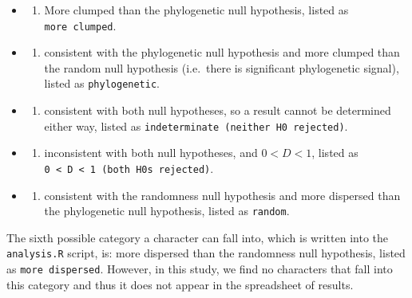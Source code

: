 \begin{itemize}
\item
  \begin{enumerate}
  \def\labelenumi{(\roman{enumi})}
  \tightlist
  \item
    More clumped than the phylogenetic null hypothesis, listed as
    \texttt{more\ clumped}.
  \end{enumerate}
\item
  \begin{enumerate}
  \def\labelenumi{(\roman{enumi})}
  \setcounter{enumi}{1}
  \tightlist
  \item
    consistent with the phylogenetic null hypothesis and more clumped
    than the random null hypothesis (i.e.~there is significant
    phylogenetic signal), listed as \texttt{phylogenetic}.
  \end{enumerate}
\item
  \begin{enumerate}
  \def\labelenumi{(\roman{enumi})}
  \setcounter{enumi}{2}
  \tightlist
  \item
    consistent with both null hypotheses, so a result cannot be
    determined either way, listed as
    \texttt{indeterminate\ (neither\ H0\ rejected)}.
  \end{enumerate}
\item
  \begin{enumerate}
  \def\labelenumi{(\roman{enumi})}
  \setcounter{enumi}{3}
  \tightlist
  \item
    inconsistent with both null hypotheses, and \(0 < D < 1\), listed as
    \texttt{0\ \textless{}\ D\ \textless{}\ 1\ (both\ H0s\ rejected)}.
  \end{enumerate}
\item
  \begin{enumerate}
  \def\labelenumi{(\alph{enumi})}
  \setcounter{enumi}{21}
  \tightlist
  \item
    consistent with the randomness null hypothesis and more dispersed
    than the phylogenetic null hypothesis, listed as \texttt{random}.
  \end{enumerate}
\end{itemize}

The sixth possible category a character can fall into, which is written
into the \texttt{analysis.R} script, is: more dispersed than the
randomness null hypothesis, listed as \texttt{more\ dispersed}. However,
in this study, we find no characters that fall into this category and
thus it does not appear in the spreadsheet of results.

